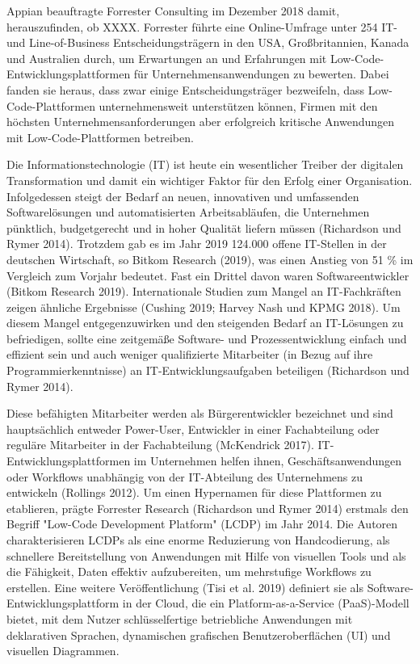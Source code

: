 \documentclass{article}
\begin{document}
	
	
	Appian beauftragte Forrester Consulting im Dezember 2018 damit, herauszufinden, ob XXXX. Forrester führte eine Online-Umfrage unter 254 IT- und Line-of-Business Entscheidungsträgern in den USA, Großbritannien, Kanada und Australien durch, um Erwartungen an und Erfahrungen mit  Low-Code-Entwicklungsplattformen für Unternehmensanwendungen zu bewerten. Dabei fanden sie heraus, dass zwar einige Entscheidungsträger bezweifeln, dass Low-Code-Plattformen unternehmensweit unterstützen können, Firmen mit den höchsten Unternehmensanforderungen aber erfolgreich kritische Anwendungen mit Low-Code-Plattformen betreiben.	  \cite{EmmaVanPelt.2019}	
	
	
	
	
	Die Informationstechnologie (IT) ist heute ein wesentlicher Treiber der digitalen Transformation und damit ein wichtiger Faktor für den Erfolg einer Organisation. Infolgedessen steigt der Bedarf an neuen, innovativen und umfassenden Softwarelösungen und automatisierten Arbeitsabläufen, die Unternehmen pünktlich, budgetgerecht und in hoher Qualität liefern müssen (Richardson und Rymer 2014). 
	Trotzdem gab es im Jahr 2019 124.000 offene IT-Stellen in der deutschen Wirtschaft, so Bitkom Research (2019), was einen 	Anstieg von 51 \% im Vergleich zum Vorjahr bedeutet. Fast ein Drittel davon waren Softwareentwickler (Bitkom Research 2019). 
	Internationale Studien zum Mangel an IT-Fachkräften zeigen ähnliche Ergebnisse (Cushing 2019; Harvey Nash und KPMG 2018). Um diesem Mangel entgegenzuwirken und den steigenden Bedarf an IT-Lösungen zu befriedigen, sollte eine zeitgemäße Software- und Prozessentwicklung einfach und effizient sein und auch weniger qualifizierte Mitarbeiter (in Bezug auf ihre Programmierkenntnisse) an IT-Entwicklungsaufgaben beteiligen (Richardson und Rymer 2014). 
	
	Diese befähigten Mitarbeiter werden als Bürgerentwickler bezeichnet und sind hauptsächlich entweder Power-User, Entwickler in einer Fachabteilung oder reguläre Mitarbeiter in der Fachabteilung (McKendrick 2017).
	IT-Entwicklungsplattformen im Unternehmen helfen ihnen, Geschäftsanwendungen oder Workflows unabhängig von der IT-Abteilung des Unternehmens zu entwickeln (Rollings 2012). 
	Um einen Hypernamen für diese Plattformen zu etablieren, prägte Forrester Research (Richardson und Rymer 2014) erstmals den Begriff "Low-Code Development Platform" (LCDP) im Jahr 2014. Die Autoren charakterisieren LCDPs als eine enorme Reduzierung von Handcodierung, als schnellere Bereitstellung von Anwendungen mit Hilfe von visuellen Tools und als die Fähigkeit, Daten effektiv aufzubereiten, um mehrstufige Workflows zu erstellen. 
	Eine weitere Veröffentlichung (Tisi et al. 2019) definiert sie als Software-Entwicklungsplattform in der Cloud, die ein Platform-as-a-Service (PaaS)-Modell bietet, mit dem Nutzer schlüsselfertige betriebliche Anwendungen mit deklarativen Sprachen, dynamischen grafischen Benutzeroberflächen (UI) und visuellen Diagrammen.
	
\end{document}
